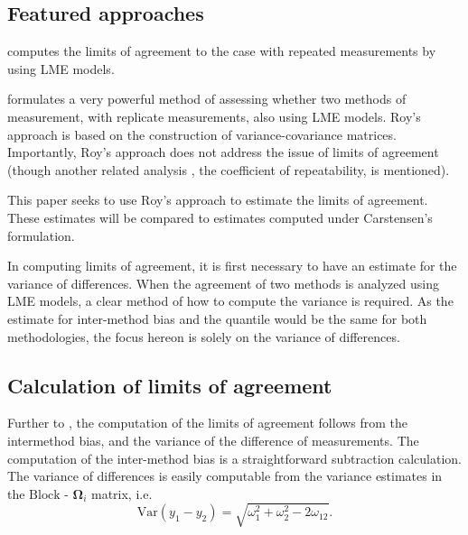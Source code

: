 \documentclass[12pt, a4paper]{report}
\theoremstyle{plain}
\theoremstyle{definition}
\theoremstyle{remark}
\begin{document}
	
	
	
	
	
	
	
	
	
	
	
	\subsection{Featured approaches}
	
	\citet{BXC2008} computes the limits of agreement to the case with repeated measurements by using LME models.
	
	\citet{ARoy2009} formulates a very powerful method of assessing whether two methods of measurement, with replicate measurements, also using LME models. Roy's approach is based on the construction of variance-covariance matrices.
	Importantly, Roy's approach does not address the issue of limits of agreement (though another related analysis , the coefficient of repeatability, is mentioned).
	
	This paper seeks to use Roy's approach to estimate the limits of agreement. These estimates will be compared to estimates computed under Carstensen's formulation.
	
	In computing limits of agreement, it is first necessary to have an estimate for the variance of differences. When the agreement of two methods is analyzed using LME models, a clear method of how to compute the variance is required. As the estimate for inter-method bias and the quantile would be the same for both methodologies, the focus hereon is solely on the variance of differences.
	
	\newpage
	
	
	
	
	\subsection{Calculation of limits of agreement }
	
	
	Further to \citet{BA86}, the computation of the limits of agreement follows from the intermethod bias, and the variance of the difference of measurements. The computation of the inter-method bias is a straightforward subtraction calculation. The variance of differences is easily computable from the variance estimates in the ${\mbox{Block - }\boldsymbol \Omega_{i}}$ matrix, i.e.
	\[
	\mathrm{Var}(y_1 - y_2) = \sqrt{ \omega^2_1 + \omega^2_2 - 2\omega_{12}}.
	\]
	
\end{document}
